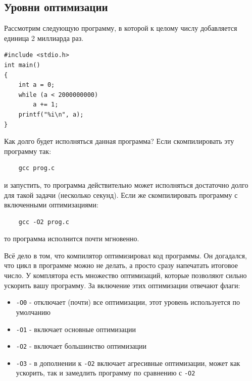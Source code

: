 \documentclass[10pt]{article}
\begin{document}

\newpage
\subsection*{Уровни оптимизации}
Рассмотрим следующую программу, в которой к целому числу добавляется единица 2 миллиарда раз. 
\begin{lstlisting}
#include <stdio.h>
int main() 
{
	int a = 0;
    while (a < 2000000000)
    	a += 1;
    printf("%i\n", a);
}
\end{lstlisting}
Как долго будет исполняться данная программа? Если скомпилировать эту программу так:
\begin{verbatim}
    gcc prog.c
\end{verbatim}
и запустить, то программа действительно может исполняться достаточно долго для такой задачи (несколько секунд). Если же скомпилировать программу с включенными оптимизациями:
\begin{verbatim}
    gcc -O2 prog.c
\end{verbatim}
то программа исполнится почти мгновенно.

Всё дело в том, что компилятор оптимизировал код программы. Он догадался, что цикл в программе можно не делать, а просто сразу напечатать итоговое число. У комплятора есть множество оптимизаций, которые позволяют сильно ускорить вашу программу. За включение этих оптимизации отвечают флаги:
\begin{itemize}
\item \texttt{-O0} - отключает (почти) все оптимизации, этот уровень используется по умолчанию
\item \texttt{-O1} - включает основные оптимизации
\item \texttt{-O2} - включает большинство оптимизации
\item \texttt{-O3} - в дополнении к \texttt{-O2} включает агресивные оптимизации, может как ускорить, так и замедлить программу по сравнению с \texttt{-O2}
\end{itemize}
\end{document}
